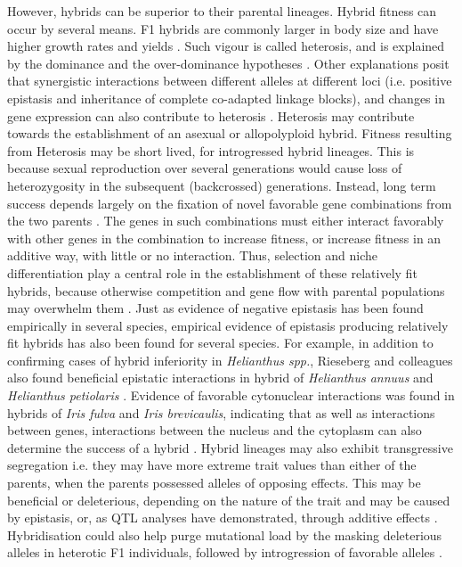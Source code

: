 However, hybrids can be superior to their parental lineages. Hybrid fitness can occur by several means. F1 hybrids are commonly larger in body size and have higher growth rates and yields \parencite{Baack2007,Hedrick2013,Burke2001GeneticsHybrids}. Such vigour is called heterosis, and is explained by the dominance and the over-dominance hypotheses \parencite{Baack2007,Lippman2007}. Other explanations posit that synergistic interactions between different alleles at different loci (i.e. positive epistasis and inheritance of complete co-adapted linkage blocks), and changes in gene expression can also contribute to heterosis \parencite{Baack2007,Swanson-Wagner2006AllParents.}. Heterosis may contribute towards the establishment of an asexual or allopolyploid hybrid. Fitness resulting from Heterosis may be short lived, for introgressed hybrid lineages. This is because sexual reproduction over several generations would cause loss of heterozygosity in the subsequent (backcrossed) generations. Instead, long term success depends largely on the fixation of novel favorable gene combinations from the two parents \parencite{Baack2007,Burke2001GeneticsHybrids}. The genes in such combinations must either interact favorably with other genes in the combination to increase fitness, or ⁠increase fitness in an additive way, with little or no interaction. Thus, selection and niche differentiation play a central role in the establishment of these relatively fit hybrids, because otherwise competition and gene flow with parental populations may overwhelm them \parencite{Buerkle2000TheSpeciation.,Rieseberg1999TransgressiveSpeciation.}. Just as evidence of negative epistasis has been found empirically in several species, empirical evidence of epistasis producing relatively fit hybrids has also been found for several species. For example, in addition to confirming cases of hybrid inferiority in \textit{Helianthus spp.}, Rieseberg and colleagues also found beneficial epistatic interactions in hybrid of \textit{Helianthus annuus} and \textit{Helianthus petiolaris} \parencite{Gardner2000InferringZones,Rieseberg1996}. Evidence of favorable cytonuclear interactions was found in hybrids of \textit{Iris fulva} and \textit{Iris brevicaulis}, indicating that as well as interactions between genes, interactions between the nucleus and the cytoplasm can also determine the success of a hybrid \parencite{Burke1998GeneticHybrids}. Hybrid lineages may also exhibit transgressive segregation i.e. they may have more extreme trait values than either of the parents, when the parents possessed alleles of opposing effects. This may be beneficial or deleterious, depending on the nature of the trait and may be caused by epistasis, or, as QTL analyses have demonstrated, through additive effects \parencite{Baack2007,Burke2001GeneticsHybrids}.
Hybridisation could also help purge mutational load by the masking deleterious alleles in heterotic F1 individuals, followed by introgression of favorable alleles \parencite{Ingvarsson2000HeterosisRate.}.

